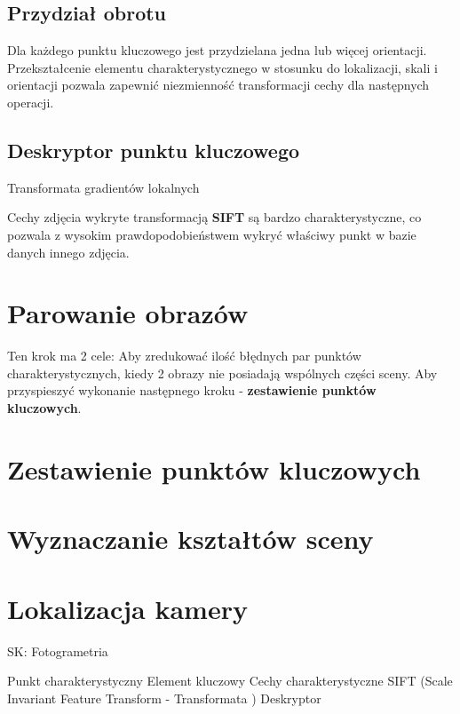\subsection{Przydział obrotu}
      Dla każdego punktu kluczowego jest przydzielana jedna lub więcej orientacji.
      Przekształcenie elementu charakterystycznego w stosunku do lokalizacji, skali i orientacji pozwala zapewnić niezmienność transformacji cechy dla następnych operacji.
\subsection{Deskryptor punktu kluczowego}
      Transformata gradientów lokalnych

Cechy zdjęcia wykryte transformacją  \textbf{SIFT} są bardzo charakterystyczne, co pozwala z wysokim prawdopodobieństwem wykryć właściwy punkt w bazie danych innego zdjęcia.

\section{Parowanie obrazów}
Ten krok ma 2 cele:
Aby zredukować ilość błędnych par punktów charakterystycznych, kiedy 2 obrazy nie posiadają wspólnych części sceny.
Aby przyspieszyć wykonanie następnego kroku - \textbf{zestawienie punktów kluczowych}.
\section{Zestawienie punktów kluczowych}
\section{Wyznaczanie kształtów sceny}
\section{Lokalizacja kamery}




SK:
Fotogrametria

Punkt charakterystyczny
Element kluczowy
Cechy charakterystyczne
SIFT (Scale Invariant Feature Transform - Transformata )
Deskryptor
